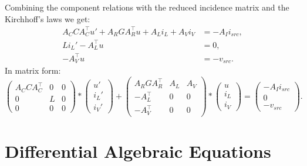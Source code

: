 	\begin{frame}
		Combining the component relations with the reduced incidence matrix and the Kirchhoff's laws we get:
		\begin{displaymath}
			\begin{aligned}
				A_C C A_C^\top u' + A_R G A_R^\top u + A_L i_L + A_V i_V &= - A_I i_{src} , \\
				L i_L'	- A_L^\top u &= 0 , \\
				-A_V^\top u &=  -v_{src}.
			\end{aligned}	
		\end{displaymath}
		In matrix form:
		\begin{equation}
			\label{MNA_Matrixform}
			\begin{pmatrix}
				A_C C A_C^\top & 0 & 0 \\
				0 & L & 0 \\
				0 & 0 & 0
			\end{pmatrix}
			*
			\begin{pmatrix}
				u' \\
				i_L' \\
				i_V'
			\end{pmatrix}
			+
			\begin{pmatrix}
				A_R G A_R^\top & A_L & A_V \\
				-A_L^\top & 0 & 0 \\
				-A_V^\top & 0 & 0 
			\end{pmatrix}
			*
			\begin{pmatrix}
				u \\
				i_L \\
				i_V
			\end{pmatrix}
			=
			\begin{pmatrix}
				-A_I i_{src} \\
				0 \\
				-v_{src}
			\end{pmatrix} . 
		\end{equation}
	\end{frame}

\section*{Differential Algebraic Equations}
